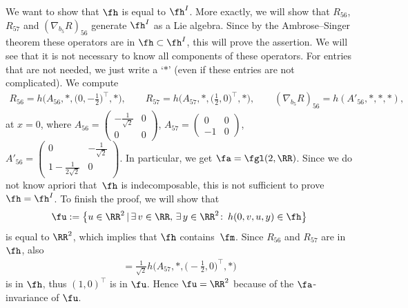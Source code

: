 We want to show that $\fh$ is equal to $\fh^I$. More exactly, we will show that $R_{56}$, $R_{57}$ and $(\nabla _{b_5}R)_{56}$ generate $\fh^I$ as a Lie algebra. Since by the Ambrose--Singer theorem these operators are in $\fh\subset \fh^I$, this will prove the assertion. We will see that it is not necessary to know all components of these operators. For entries that are not needed, we just write a `$*$' (even if these entries are not complicated). We compute
\begin{gather*}
R_{56}= h\big(A_{56},*,\big( 0,-\tfrac 12\big)^\top\!,* \big), \qquad\!\!
R_{57}= h\big(A_{57},*,\big( \tfrac12,0)^\top\!,* \big) , \qquad\!\!
(\nabla _{b_5}R)_{56}= h(A'_{56},*,*,* ),
\end{gather*}
at $x=0$, where $ A_{56}=\left( \begin{smallmatrix} -\frac1{\sqrt 2}&0\\0&0\end{smallmatrix}\right)$, $ A_{57}=\left( \begin{smallmatrix}0&0\\-1&0\end{smallmatrix}\right)$, $ A'_{56}=\left( \begin{smallmatrix}0& -\frac1{\sqrt 2}\\1-\frac1{2\sqrt 2}&0\end{smallmatrix}\right)$. In particular, we get $\fa=\fgl(2,\RR)$. Since we do not know apriori that~$\fh$ is indecomposable, this is not sufficient to prove $\fh=\fh^I$. To finish the proof, we will show that \begin{gather*}\fu:= \big\{u\in\RR^2 \,|\, \exists\, v\in\RR,\,\exists\, y\in\RR^2\colon\, h(0,v,u,y)\in \fh\big\}\end{gather*} is equal to $\RR^2$, which implies that $\fh$ contains~$\fm$. Since $R_{56}$ and $R_{57}$ are in $\fh$, also
\begin{gather*}[R_{56},R_{57}]= \tfrac 1{\sqrt{2} }h\big(A_{57},*,\big({-} \tfrac12,0\big)^\top,*\big) \end{gather*}
is in $\fh$, thus $(1,0)^\top$ is in $\fu$. Hence $\fu=\RR^2$ because of the $\fa$-invariance of $\fu$.

